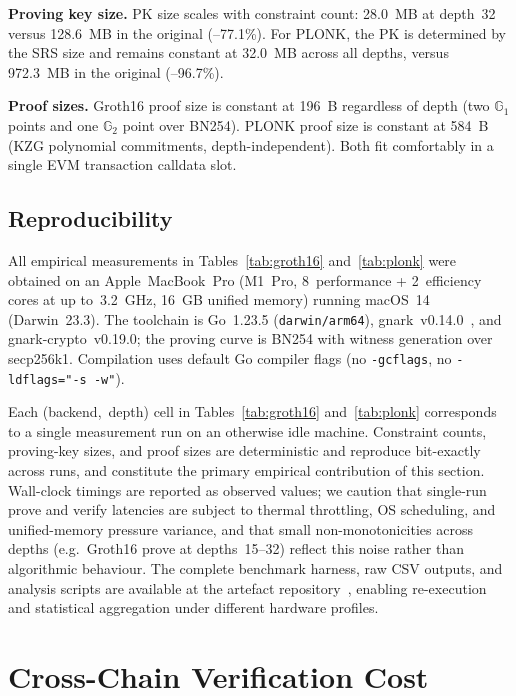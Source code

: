 \documentclass[conference]{IEEEtran}
\begin{document}
\textbf{Proving key size.}
PK size scales with constraint count: 28.0~MB at depth~32 versus
128.6~MB in the original (--77.1\%).
For PLONK, the PK is determined by the SRS size and remains constant
at 32.0~MB across all depths, versus 972.3~MB in the original (--96.7\%).

\textbf{Proof sizes.}
Groth16 proof size is constant at 196~B regardless of depth (two
$\mathbb{G}_1$ points and one $\mathbb{G}_2$ point over BN254).
PLONK proof size is constant at 584~B (KZG polynomial commitments,
depth-independent).
Both fit comfortably in a single EVM transaction calldata slot.

\subsection{Reproducibility}
\label{sec:reproducibility}

All empirical measurements in Tables~\ref{tab:groth16}
and~\ref{tab:plonk} were obtained on an Apple~MacBook~Pro (M1~Pro,
8~performance + 2~efficiency cores at up to~3.2~GHz, 16~GB unified
memory) running macOS~14 (Darwin~23.3).
The toolchain is Go~1.23.5 (\texttt{darwin/arm64}),
gnark~v0.14.0~\cite{gnark}, and gnark-crypto~v0.19.0; the proving curve
is BN254 with witness generation over secp256k1.
Compilation uses default Go compiler flags (no \texttt{-gcflags},
no \texttt{-ldflags="-s -w"}).

Each (backend,~depth) cell in
Tables~\ref{tab:groth16} and~\ref{tab:plonk} corresponds to a single
measurement run on an otherwise idle machine.
Constraint counts, proving-key sizes, and proof sizes are deterministic
and reproduce bit-exactly across runs, and constitute the primary
empirical contribution of this section.
Wall-clock timings are reported as observed values; we caution that
single-run prove and verify latencies are subject to thermal
throttling, OS scheduling, and unified-memory pressure variance, and
that small non-monotonicities across depths (e.g.\ Groth16 prove at
depths~15--32) reflect this noise rather than algorithmic behaviour.
The complete benchmark harness, raw CSV outputs, and analysis scripts
are available at the artefact repository~\cite{ArtifactRepo}, enabling
re-execution and statistical aggregation under different hardware
profiles.

\section{Cross-Chain Verification Cost}
\label{sec:crosschain}
\end{document}
